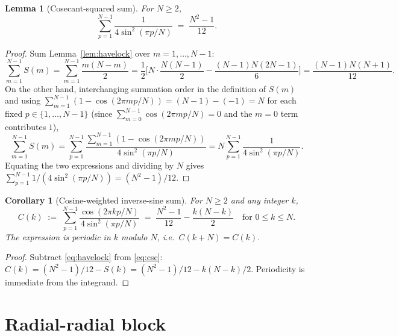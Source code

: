 \documentclass[11pt]{article}
\newtheorem{lemma}{Lemma}
\newtheorem{corollary}{Corollary}
\theoremstyle{remark}
\begin{document}
\begin{lemma}[Cosecant-squared sum]\label{lem:csc}
For $N \ge 2$,
\begin{equation}\label{eq:csc}
  \sum_{p=1}^{N-1} \frac{1}{4 \sin^2(\pi p / N)}
     \;=\; \frac{N^2 - 1}{12}.
\end{equation}
\end{lemma}

\begin{proof}
Sum Lemma~\ref{lem:havelock} over $m = 1, \ldots, N - 1$:
\[
  \sum_{m=1}^{N-1} S(m)
   = \sum_{m=1}^{N-1}\frac{m(N-m)}{2}
   = \frac{1}{2}\bigl[N \cdot {\textstyle\frac{N(N-1)}{2}} - {\textstyle\frac{(N-1)N(2N-1)}{6}}\bigr]
   = \frac{(N-1)N(N+1)}{12}.
\]
On the other hand, interchanging summation order in the definition of $S(m)$
and using $\sum_{m=1}^{N-1}(1 - \cos(2\pi m p / N)) = (N - 1) - (-1) = N$
for each fixed $p \in \{1, \ldots, N - 1\}$ (since
$\sum_{m=0}^{N-1}\cos(2\pi m p / N) = 0$ and the $m = 0$ term contributes $1$),
\[
  \sum_{m=1}^{N-1} S(m)
   = \sum_{p=1}^{N-1}\frac{\sum_{m=1}^{N-1}(1 - \cos(2\pi m p / N))}{4\sin^2(\pi p / N)}
   = N \sum_{p=1}^{N-1}\frac{1}{4\sin^2(\pi p / N)}.
\]
Equating the two expressions and dividing by $N$ gives
$\sum_{p=1}^{N-1} 1/(4\sin^2(\pi p / N)) = (N^2 - 1)/12$.
\end{proof}

\begin{corollary}[Cosine-weighted inverse-sine sum]\label{cor:cos-over-sin}
For $N \ge 2$ and any integer $k$,
\begin{equation}\label{eq:cos-over-sin}
  C(k) \;:=\; \sum_{p=1}^{N-1} \frac{\cos(2\pi k p / N)}{4 \sin^2(\pi p / N)}
       \;=\; \frac{N^2 - 1}{12} - \frac{k(N-k)}{2}
       \quad \text{for } 0 \le k \le N.
\end{equation}
The expression is periodic in $k$ modulo $N$, i.e.\ $C(k + N) = C(k)$.
\end{corollary}

\begin{proof}
Subtract \eqref{eq:havelock} from \eqref{eq:csc}:
$C(k) = (N^2-1)/12 - S(k) = (N^2-1)/12 - k(N-k)/2$.
Periodicity is immediate from the integrand.
\end{proof}

\section{Radial-radial block}\label{sec:rr}
\end{document}
